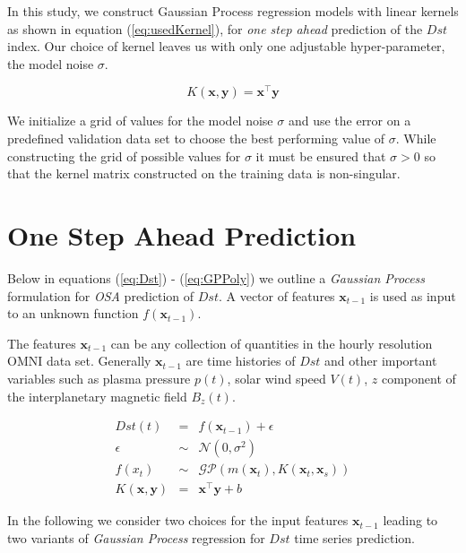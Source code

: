 \documentclass[referee,a4paper,12pt,traditabstract]{swsc}
\begin{document}
\begin{linenumbers}
In this study, we construct Gaussian Process regression models with linear kernels as shown in equation (\ref{eq:usedKernel}), for \emph{one step ahead} prediction of the $Dst$ index. Our choice of kernel leaves us with only one adjustable hyper-parameter, the model noise $\sigma$. 

\begin{equation}\label{eq:usedKernel}
    K(\mathbf{x}, \mathbf{y}) = \mathbf{x}^\intercal \mathbf{y}
\end{equation}

We initialize a grid of values for the model noise $\sigma$ and use the error on a predefined validation data set to choose the best performing value of $\sigma$. While constructing the grid of possible values for $\sigma$ it must be ensured that $\sigma > 0$ so that the kernel matrix constructed on the training data is non-singular.

\section{One Step Ahead Prediction} \label{sec:osa}

Below in equations (\ref{eq:Dst}) - (\ref{eq:GPPoly}) we outline a \emph{Gaussian Process} formulation for \emph{OSA} prediction of $Dst$. A vector of features $\mathbf{x}_{t-1}$ is used as input to an unknown function $f(\mathbf{x}_{t-1})$.

The features $\mathbf{x}_{t-1}$ can be any collection of quantities in the hourly resolution OMNI data set. Generally $\mathbf{x}_{t-1}$ are time histories of $Dst$ and other important variables such as plasma pressure $p(t)$, solar wind speed $V(t)$, $z$ component of the interplanetary magnetic field $B_z(t)$.

\begin{eqnarray}
    Dst(t) & = & f(\mathbf{x}_{t-1}) + \epsilon \label{eq:Dst} \\
    \epsilon & \sim & \mathcal{N}(0, \sigma^2) \label{eq:GPNoise} \\
    f(x_t) & \sim & \mathcal{GP}(m(\mathbf{x}_t), K(\mathbf{x}_t, \mathbf{x}_s)) \label{eq:DstGP} \\
    K(\mathbf{x}, \mathbf{y}) & = & \mathbf{x}^\intercal \mathbf{y} + b \label{eq:GPPoly}
\end{eqnarray}

In the following we consider two choices for the input features $\mathbf{x}_{t-1}$ leading to two variants of \emph{Gaussian Process} regression for $Dst$ time series prediction.


\end{linenumbers}
\end{document}
